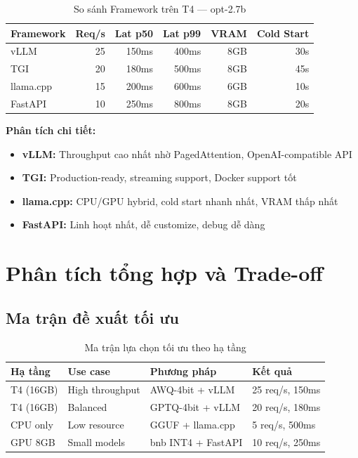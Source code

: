 \documentclass[12pt,a4paper]{report}
\begin{document}
\begin{table}[h]
\centering
\caption{So sánh Framework trên T4 --- opt-2.7b}
\label{tab:framework-results}
\begin{tabular}{lrrrrr}
\toprule
\textbf{Framework} & \textbf{Req/s} & \textbf{Lat p50} & \textbf{Lat p99} & \textbf{VRAM} & \textbf{Cold Start} \\
\midrule
vLLM & 25 & 150ms & 400ms & 8GB & 30s \\
TGI & 20 & 180ms & 500ms & 8GB & 45s \\
llama.cpp & 15 & 200ms & 600ms & 6GB & 10s \\
FastAPI & 10 & 250ms & 800ms & 8GB & 20s \\
\bottomrule
\end{tabular}
\end{table}

\textbf{Phân tích chi tiết:}
\begin{itemize}
  \item \textbf{vLLM:} Throughput cao nhất nhờ PagedAttention, OpenAI-compatible API
  \item \textbf{TGI:} Production-ready, streaming support, Docker support tốt
  \item \textbf{llama.cpp:} CPU/GPU hybrid, cold start nhanh nhất, VRAM thấp nhất
  \item \textbf{FastAPI:} Linh hoạt nhất, dễ customize, debug dễ dàng
\end{itemize}

\section{Phân tích tổng hợp và Trade-off}

\subsection{Ma trận đề xuất tối ưu}

\begin{table}[h]
\centering
\caption{Ma trận lựa chọn tối ưu theo hạ tầng}
\label{tab:recommendation-matrix}
\begin{tabular}{p{3cm}p{3cm}p{3cm}p{3.5cm}}
\toprule
\textbf{Hạ tầng} & \textbf{Use case} & \textbf{Phương pháp} & \textbf{Kết quả} \\
\midrule
T4 (16GB) & High throughput & AWQ-4bit + vLLM & 25 req/s, 150ms \\
T4 (16GB) & Balanced & GPTQ-4bit + vLLM & 20 req/s, 180ms \\
CPU only & Low resource & GGUF + llama.cpp & 5 req/s, 500ms \\
GPU 8GB & Small models & bnb INT4 + FastAPI & 10 req/s, 250ms \\
\bottomrule
\end{tabular}
\end{table}
\end{document}
